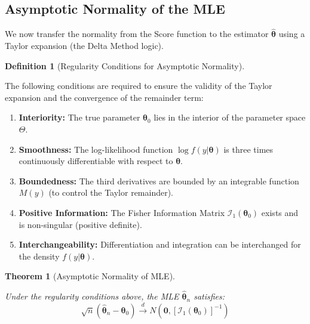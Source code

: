 \documentclass[
  letterpaper,
  DIV=11,
  numbers=noendperiod]{scrreprt}
\renewcommand{\[}{\begin{equation}}
\renewcommand{\]}{\end{equation}}
\theoremstyle{definition}
\newtheorem{definition}{Definition}[chapter]
\theoremstyle{plain}
\theoremstyle{plain}
\theoremstyle{plain}
\newtheorem{theorem}{Theorem}[chapter]
\theoremstyle{definition}
\theoremstyle{plain}
\theoremstyle{remark}
\begin{document}
\subsection{Asymptotic Normality of the
MLE}\label{asymptotic-normality-of-the-mle}

We now transfer the normality from the Score function to the estimator
\(\hat{\boldsymbol{\theta}}\) using a Taylor expansion (the Delta Method
logic).

\begin{definition}[Regularity Conditions for Asymptotic
Normality]\protect\hypertarget{def-regularity-conditions}{}\label{def-regularity-conditions}

The following conditions are required to ensure the validity of the
Taylor expansion and the convergence of the remainder term:

\begin{enumerate}
\def\labelenumi{\arabic{enumi}.}
\item
  \textbf{Interiority:} The true parameter \(\boldsymbol{\theta}_0\)
  lies in the interior of the parameter space \(\Theta\).
\item
  \textbf{Smoothness:} The log-likelihood function
  \(\log f(y|\boldsymbol{\theta})\) is three times continuously
  differentiable with respect to \(\boldsymbol{\theta}\).
\item
  \textbf{Boundedness:} The third derivatives are bounded by an
  integrable function \(M(y)\) (to control the Taylor remainder).
\item
  \textbf{Positive Information:} The Fisher Information Matrix
  \(\mathcal{I}_1(\boldsymbol{\theta}_0)\) exists and is non-singular
  (positive definite).
\item
  \textbf{Interchangeability:} Differentiation and integration can be
  interchanged for the density \(f(y|\boldsymbol{\theta})\).
\end{enumerate}

\end{definition}

\begin{theorem}[Asymptotic Normality of
MLE]\protect\hypertarget{thm-mle-normality}{}\label{thm-mle-normality}

Under the regularity conditions above, the MLE
\(\hat{\boldsymbol{\theta}}_n\) satisfies: \[
\sqrt{n}(\hat{\boldsymbol{\theta}}_n - \boldsymbol{\theta}_0) \xrightarrow{d} N\left(\mathbf{0}, [\mathcal{I}_1(\boldsymbol{\theta}_0)]^{-1}\right)
\]

\end{theorem}
\end{document}

